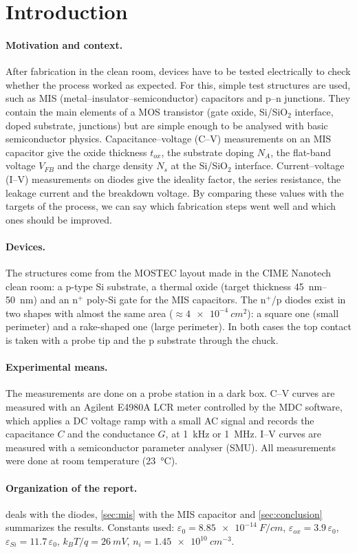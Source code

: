 \section{Introduction}

\paragraph{Motivation and context.}
After fabrication in the clean room, devices have to be tested electrically to check
whether the process worked as expected. For this, simple test structures are used, such as
MIS (metal--insulator--semiconductor) capacitors and p--n junctions. They contain the main
elements of a MOS transistor (gate oxide, Si/SiO$_2$ interface, doped substrate, junctions)
but are simple enough to be analysed with basic semiconductor physics.
Capacitance--voltage (C--V) measurements on an MIS capacitor give the oxide thickness
$t_{ox}$, the substrate doping $N_A$, the flat-band voltage $V_{FB}$ and the charge density
$N_s$ at the Si/SiO$_2$ interface. Current--voltage (I--V) measurements on diodes give the
ideality factor, the series resistance, the leakage current and the breakdown voltage.
By comparing these values with the targets of the process, we can say which fabrication steps
went well and which ones should be improved.

\paragraph{Devices.}
The structures come from the MOSTEC layout made in the CIME Nanotech clean room: a p-type
Si substrate, a thermal oxide (target thickness \SIrange{45}{50}{nm}) and an n$^+$ poly-Si
gate for the MIS capacitors. The n$^+$/p diodes exist in two shapes with almost the same area
($\approx\SI{4e-4}{cm^2}$): a square one (small perimeter) and a rake-shaped one (large
perimeter). In both cases the top contact is taken with a probe tip and the p substrate
through the chuck.

\paragraph{Experimental means.}
The measurements are done on a probe station in a dark box. C--V curves are measured with an
Agilent E4980A LCR meter controlled by the MDC software, which applies a DC voltage ramp with a
small AC signal and records the capacitance $C$ and the conductance $G$, at \SI{1}{kHz} or
\SI{1}{MHz}. I--V curves are measured with a semiconductor parameter analyser (SMU).
All measurements were done at room temperature (\SI{23}{\celsius}).

\paragraph{Organization of the report.}
 deals with the diodes, \cref{sec:mis} with the MIS capacitor and
\cref{sec:conclusion} summarizes the results.
Constants used: $\varepsilon_0=\SI{8.85e-14}{F/cm}$, $\varepsilon_{ox}=3.9\,\varepsilon_0$,
$\varepsilon_{Si}=11.7\,\varepsilon_0$, $k_BT/q=\SI{26}{mV}$,
$n_i=\SI{1.45e10}{cm^{-3}}$.
